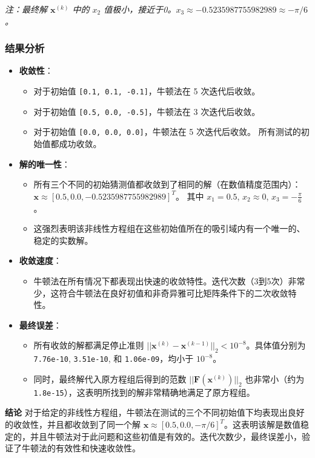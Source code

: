 \documentclass[11pt]{article}
\providecommand{\tightlist}{%
      \setlength{\itemsep}{0pt}\setlength{\parskip}{0pt}}
\begin{document}
\emph{注：最终解 \(\mathbf{x}^{(k)}\) 中的 \(x_2\)
值极小，接近于0。\(x_3 \approx -0.5235987755982989 \approx -\pi/6\)。}

\subsubsection{结果分析}\label{ux7ed3ux679cux5206ux6790}

\begin{itemize}
\tightlist
\item
  \textbf{收敛性}：

  \begin{itemize}
  \tightlist
  \item
    对于初始值 \texttt{{[}0.1,\ 0.1,\ -0.1{]}}，牛顿法在 5
    次迭代后收敛。
  \item
    对于初始值 \texttt{{[}0.5,\ 0.0,\ -0.5{]}}，牛顿法在 3
    次迭代后收敛。
  \item
    对于初始值 \texttt{{[}0.0,\ 0.0,\ 0.0{]}}，牛顿法在 5 次迭代后收敛。
    所有测试的初始值都成功收敛。
  \end{itemize}
\item
  \textbf{解的唯一性}：

  \begin{itemize}
  \tightlist
  \item
    所有三个不同的初始猜测值都收敛到了相同的解（在数值精度范围内）：
    \(\mathbf{x} \approx [0.5, 0.0, -0.5235987755982989]^T\)。 其中
    \(x_1 = 0.5\), \(x_2 \approx 0\), \(x_3 = -\frac{\pi}{6}\)。
  \item
    这强烈表明该非线性方程组在这些初始值所在的吸引域内有一个唯一的、稳定的实数解。
  \end{itemize}
\item
  \textbf{收敛速度}：

  \begin{itemize}
  \tightlist
  \item
    牛顿法在所有情况下都表现出快速的收敛特性。迭代次数（3到5次）非常少，这符合牛顿法在良好初值和非奇异雅可比矩阵条件下的二次收敛特性。
  \end{itemize}
\item
  \textbf{最终误差}：

  \begin{itemize}
  \tightlist
  \item
    所有收敛的解都满足停止准则
    \(||\mathbf{x}^{(k)} - \mathbf{x}^{(k-1)}||_2 < 10^{-8}\)。具体值分别为
    \texttt{7.76e-10}, \texttt{3.51e-10}, 和 \texttt{1.06e-09}，均小于
    \(10^{-8}\)。
  \item
    同时，最终解代入原方程组后得到的范数
    \(||\mathbf{F}(\mathbf{x}^{(k)})||_2\) 也非常小（约为
    \texttt{1.8e-15}），这表明所找到的解非常精确地满足了原方程组。
  \end{itemize}
\end{itemize}

\textbf{结论}
对于给定的非线性方程组，牛顿法在测试的三个不同初始值下均表现出良好的收敛性，并且都收敛到了同一个解
\(\mathbf{x} \approx [0.5, 0.0, -\pi/6]^T\)。这表明该解是数值稳定的，并且牛顿法对于此问题和这些初值是有效的。迭代次数少，最终误差小，验证了牛顿法的有效性和快速收敛性。


    
    
    
\end{document}
